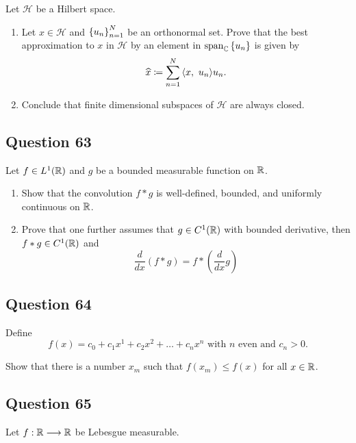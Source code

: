 \documentclass[12pt]{article}
\providecommand{\tightlist}{%
  \setlength{\itemsep}{0pt}\setlength{\parskip}{0pt}}
\begin{document}
Let \(\mathcal H\) be a Hilbert space.

\begin{enumerate}
\def\labelenumi{\arabic{enumi}.}
\tightlist
\item
  Let \(x\in \mathcal H\) and \(\left\{{u_n}\right\}_{n=1}^N\) be an orthonormal
  set. Prove that the best approximation to \(x\) in \(\mathcal H\) by
  an element in \({\mathrm{span}}_{\mathbb{C}}\left\{{u_n}\right\}\) is given by \[
    \widehat{x} \coloneqq \sum_{n=1}^N {\left\langle {x},~{u_n} \right\rangle}u_n.
    \]
\item
  Conclude that finite dimensional subspaces of \(\mathcal H\) are
  always closed.
\end{enumerate}

\hypertarget{question-63-1}{%
\subsection{Question 63}\label{question-63-1}}

Let \(f \in L^1({\mathbb{R}})\) and \(g\) be a bounded measurable function on
\({\mathbb{R}}\).

\begin{enumerate}
\def\labelenumi{\arabic{enumi}.}
\tightlist
\item
  Show that the convolution \(f\ast g\) is well-defined, bounded, and
  uniformly continuous on \({\mathbb{R}}\).
\item
  Prove that one further assumes that \(g \in C^1({\mathbb{R}})\) with bounded
  derivative, then \(f\ast g \in C^1({\mathbb{R}})\) and \[
  \frac{d}{d x}(f * g)=f *\left(\frac{d}{d x} g\right)
  \]
\end{enumerate}

\hypertarget{question-64-1}{%
\subsection{Question 64}\label{question-64-1}}

Define \[
f(x)=c_{0}+c_{1} x^{1}+c_{2} x^{2}+\ldots+c_{n} x^{n} \text { with } n \text { even and } c_{n}>0.
\]

Show that there is a number \(x_m\) such that \(f(x_m) \leq f(x)\) for
all \(x\in {\mathbb{R}}\).

\hypertarget{question-65-1}{%
\subsection{Question 65}\label{question-65-1}}

Let \(f: {\mathbb{R}} \longrightarrow {\mathbb{R}}\) be Lebesgue measurable.
\end{document}
